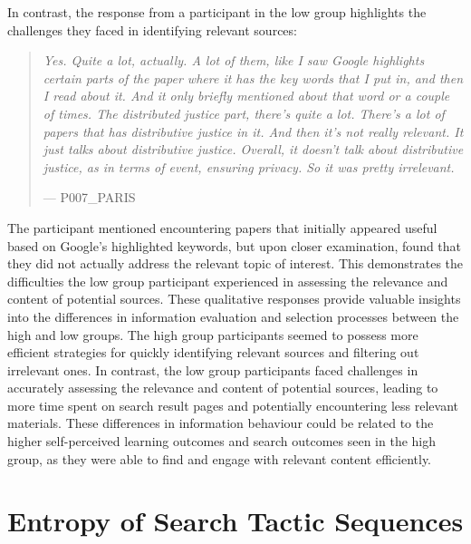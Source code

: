 \documentclass[letterpaper, nobind]{templates/ociamthesis}
\begin{document}
In contrast, the response from a participant in the low group highlights the challenges they faced in identifying relevant sources:

\begin{quote}
\emph{Yes. Quite a lot, actually. A lot of them, like I saw Google highlights certain parts of the paper where it has the key words that I put in, and then I read about it. And it only briefly mentioned about that word or a couple of times. The distributed justice part, there's quite a lot. There's a lot of papers that has distributive justice in it. And then it's not really relevant. It just talks about distributive justice. Overall, it doesn't talk about distributive justice, as in terms of event, ensuring privacy. So it was pretty irrelevant.}

\hfill --- P007\_PARIS
\end{quote}

The participant mentioned encountering papers that initially appeared useful based on Google's highlighted keywords, but upon closer examination, found that they did not actually address the relevant topic of interest. This demonstrates the difficulties the low group participant experienced in assessing the relevance and content of potential sources.
These qualitative responses provide valuable insights into the differences in information evaluation and selection processes between the high and low groups. The high group participants seemed to possess more efficient strategies for quickly identifying relevant sources and filtering out irrelevant ones. In contrast, the low group participants faced challenges in accurately assessing the relevance and content of potential sources, leading to more time spent on search result pages and potentially encountering less relevant materials.
These differences in information behaviour could be related to the higher self-perceived learning outcomes and search outcomes seen in the high group, as they were able to find and engage with relevant content efficiently.

\hypertarget{entropy-of-search-tactic-sequences}{%
\section{Entropy of Search Tactic Sequences}\label{entropy-of-search-tactic-sequences}}
\end{document}
